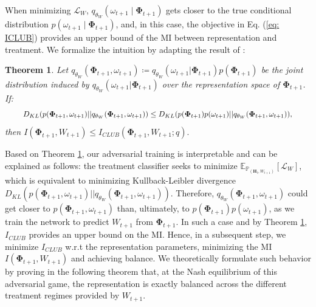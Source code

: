 \documentclass{article}
\theoremstyle{plain}
\newtheorem{theorem}{Theorem}[section]
\theoremstyle{definition}
\theoremstyle{remark}
\begin{document}
When minimizing $\mathcal{L}_W$, $q_{\theta_W}(\omega_{t+1}\mid \mathbf{\Phi}_{t+1})$ gets closer to the true conditional distribution $p(\omega_{t+1}\mid \mathbf{\Phi}_{t+1})$, and, in this case, the objective in Eq. (\ref{eq: ICLUB}) provides an upper bound of the MI between representation and treatment. We formalize the intuition by adapting the result of \cite{cheng2020club}:
\begin{theorem}\cite{cheng2020club} Let $q_{\theta_W}(\mathbf{\Phi}_{t+1}, \omega_{t+1})  \coloneqq q_{\theta_W}(\omega_{t+1}|\mathbf{\Phi}_{t+1})p(\mathbf{\Phi}_{t+1})$ be the joint distribution induced by $q_{\theta_W}(\omega_{t+1}|\mathbf{\Phi}_{t+1})$ over the representation space of $\mathbf{\Phi}_{t+1}$. If:
\begin{equation*}
\scalebox{0.9}{$
D_{KL}(p(\mathbf{\Phi}_{t+1}, \omega_{t+1})||q_{\theta_W}(\mathbf{\Phi}_{t+1}, \omega_{t+1})) 
\leq D_{KL}(p(\mathbf{\Phi}_{t+1}) p(\omega_{t+1})||q_{\theta_W}(\mathbf{\Phi}_{t+1}, \omega_{t+1})),
$}
\end{equation*}  
then $I(\mathbf{\Phi}_{t+1}, W_{t+1}) \leq I_{CLUB}(\mathbf{\Phi}_{t+1}, W_{t+1}; q).$
\label{thm: ICLUB_bound}
\end{theorem}
Based on Theorem \ref{thm: ICLUB_bound}, our adversarial training is interpretable and can be explained as follows: the treatment classifier seeks to minimize $\mathbb{E}_{\mathbb{P}_{(\mathbf{H}_t, W_{t+1})}}\left[\mathcal{L}_W\right]$, which is equivalent to minimizing Kullback-Leibler divergence $D_{KL}(p(\mathbf{\Phi}_{t+1}, \omega_{t+1})||q_{\theta_W}(\mathbf{\Phi}_{t+1}, \omega_{t+1}))$. Therefore, $q_{\theta_W}(\mathbf{\Phi}_{t+1}, \omega_{t+1})$ could get closer to $p(\mathbf{\Phi}_{t+1}, \omega_{t+1})$ than, ultimately, to $p(\mathbf{\Phi}_{t+1}) p(\omega_{t+1})$, as we train the network to predict $W_{t+1}$ from $\mathbf{\Phi}_{t+1}$. In such a case and by Theorem \ref{thm: ICLUB_bound}, $I_{CLUB}$ provides an upper bound on the MI. Hence, in a subsequent step, we minimize $I_{CLUB}$ w.r.t the representation parameters, minimizing the MI $I(\mathbf{\Phi}_{t+1}, W_{t+1})$ and achieving balance. We theoretically formulate such behavior by proving in the following theorem that, at the Nash equilibrium of this adversarial game, the representation is exactly balanced across the different treatment regimes provided by $W_{t+1}$.
\end{document}

